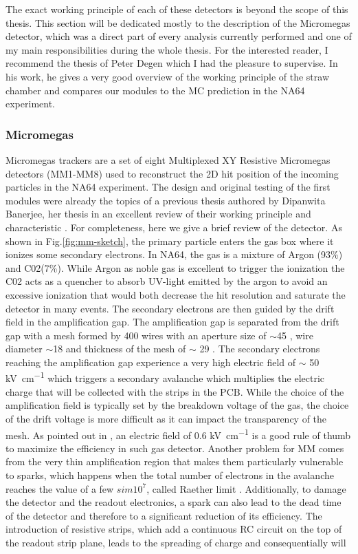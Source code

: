 The exact working principle of each of these detectors is beyond the scope of this thesis. This section will be dedicated mostly to the description of the Micromegas detector, which was a direct part of every analysis currently performed and one of my main responsibilities during the whole thesis. For the interested reader, I recommend the thesis of Peter Degen \cite{pdegen-thesis} which I had the pleasure to supervise. In his work, he gives a very good overview of the working principle of the straw chamber and compares our modules to the MC prediction in the NA64 experiment.

\subsubsection{Micromegas}

Micromegas trackers are a set of eight Multiplexed XY Resistive Micromegas detectors (MM1-MM8) used to reconstruct the 2D hit position of the incoming particles in the NA64 experiment. The design and original testing of the first modules were already the topics of a previous thesis authored by Dipanwita Banerjee, her thesis in an excellent review of their working principle and characteristic \cite{dbanerjee-thesis}. For completeness, here we give a brief review of the detector. As shown in Fig.\ref{fig:mm-sketch}, the primary particle enters the gas box where it ionizes some secondary electrons. In NA64, the gas is a mixture of Argon (93\%) and C02(7\%). While Argon as noble gas is excellent to trigger the ionization the C02 acts as a quencher to absorb UV-light emitted by the argon to avoid an excessive ionization that would both decrease the hit resolution and saturate the detector in many events. The secondary electrons are then guided by the drift field in the amplification gap. The amplification gap is separated from the drift gap with a mesh formed by 400 wires with an aperture size of $\sim$45 \mum, wire diameter $\sim$18 \mum and thickness of the mesh of $\sim$ 29 \mum. The secondary electrons reaching the amplification gap experience a very high electric field of $\sim$ 50 \si{\kilo\volt\per\centi\metre} which triggers a secondary avalanche which multiplies the electric charge that will be collected with the strips in the PCB. While the choice of the amplification field is typically set by the breakdown voltage of the gas, the choice of the drift voltage is more difficult as it can impact the transparency of the mesh. As pointed out in \cite{Bortfeldt:2014vvt}, an electric field of 0.6 \si{\kilo\volt\per\centi\metre} is a good rule of thumb to maximize the efficiency in such gas detector. Another problem for MM comes from the very thin amplification region that makes them particularly vulnerable to sparks, which happens when the total number of electrons in the avalanche reaches the value of a few $sim 10^7$, called Raether limit \cite{BAY2002162,BRESSAN1999321,Raether:102989}. Additionally, to damage the detector and the readout electronics, a spark can also lead to the dead time of the detector and therefore to a significant reduction of its efficiency. The introduction of resistive strips, which add a continuous RC circuit on the top of the readout strip plane, leads to the spreading of charge and consequentially will 